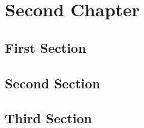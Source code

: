 \chapter{Second Chapter}
\minitocsection 
\kant
\section{First Section}
\kant
\section{Second Section}
\kant
\section{Third Section}
\kant
